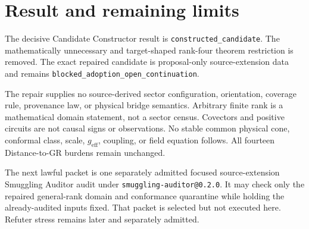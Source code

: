 \documentclass[11pt]{article}
\begin{document}
\section{Result and remaining limits}

The decisive Candidate Constructor result is
\texttt{constructed\_candidate}.  The mathematically unnecessary and
target-shaped rank-four theorem restriction is removed.  The exact repaired
candidate is proposal-only source-extension data and remains
\texttt{blocked\_adoption\_open\_continuation}.

The repair supplies no source-derived sector configuration, orientation,
coverage rule, provenance law, or physical bridge semantics.  Arbitrary finite
rank is a mathematical domain statement, not a sector census.  Covectors and
positive circuits are not causal signs or observations.  No stable common
physical cone, conformal class, scale, $g_{\mathrm{eff}}$, coupling, or field
equation follows.  All fourteen Distance-to-GR burdens remain unchanged.

The next lawful packet is one separately admitted focused source-extension
Smuggling Auditor audit under
\texttt{smuggling-auditor@0.2.0}.  It may check only the repaired general-rank
domain and conformance quarantine while holding the already-audited inputs
fixed.  That packet is selected but not executed here.  Refuter stress remains
later and separately admitted.
\end{document}
